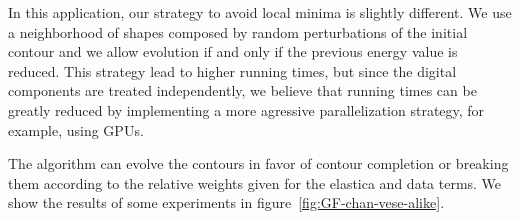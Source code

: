 \documentclass[smallextended]{svjour3}
\begin{document}
In this application, our strategy to avoid local minima is slightly different. We use a neighborhood of shapes composed by random perturbations of the initial contour and we allow evolution if and only if the previous energy value is reduced. This strategy lead to higher running times, but since the digital components are treated independently, we believe that running times can be greatly reduced by implementing a more agressive parallelization strategy, for example, using GPUs. 

The algorithm can evolve the contours in favor of contour completion or breaking them according to the relative weights given for the elastica and data terms. We show the results of some experiments in figure~\ref{fig:GF-chan-vese-alike}.

\begin{figure}
\center
{}
\end{figure}
\end{document}
